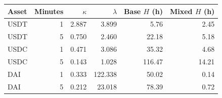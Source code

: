 \begin{tabular}{lrrrrr}
\toprule
Asset & Minutes & $\kappa$ & $\lambda$ & Base $H$ (h) & Mixed $H$ (h)\\
\midrule
USDT & 1 & 2.887 & 3.899 & 5.76 & 2.45 \tabularnewline
USDT & 5 & 0.750 & 2.460 & 22.18 & 5.18 \tabularnewline
USDC & 1 & 0.471 & 3.086 & 35.32 & 4.68 \tabularnewline
USDC & 5 & 0.143 & 1.028 & 116.47 & 14.21 \tabularnewline
DAI & 1 & 0.333 & 122.338 & 50.02 & 0.14 \tabularnewline
DAI & 5 & 0.212 & 23.018 & 78.39 & 0.72 \tabularnewline
\bottomrule
\end{tabular}
